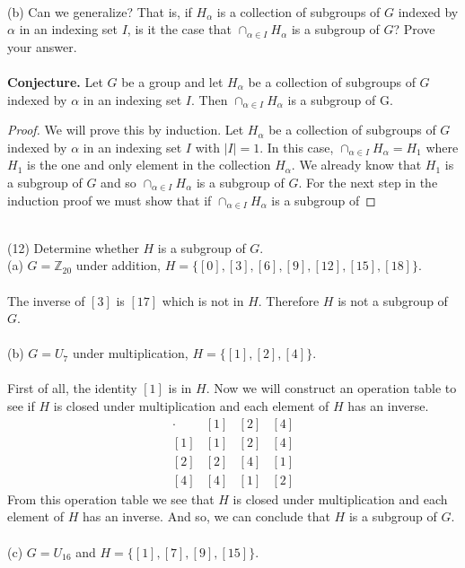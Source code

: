 \documentclass[11pt,a4paper]{article}
\begin{document}
~\\
(b) Can we generalize? That is, if ${H_\alpha}$ is a collection of subgroups of $G$ indexed by $\alpha$ in an indexing set $I$, is it the case that $\cap_{\alpha\in I} H_\alpha$ is a subgroup of $G$? Prove your answer.\\
~\\
{\bf Conjecture.} Let $G$ be a group and let ${H_\alpha}$ be a collection of subgroups of $G$ indexed by $\alpha$ in an indexing set $I$. Then $\cap_{\alpha\in I} H_\alpha$ is a subgroup of G.

\begin{proof}
We will prove this by induction. Let ${H_\alpha}$ be a collection of subgroups of $G$ indexed by $\alpha$ in an indexing set $I$ with $|I|=1$. In this case, $\cap_{\alpha\in I} H_\alpha = H_1$ where $H_1$ is the one and only element in the collection ${H_\alpha}$. We already know that $H_1$ is a subgroup of $G$ and so $\cap_{\alpha\in I} H_\alpha$ is a subgroup of $G$. For the next step in the induction proof we must show that if $\cap_{\alpha\in I} H_\alpha$ is a subgroup of 
\end{proof}
~\\
(12) Determine whether $H$ is a subgroup of $G$.\\
(a) $G=\mathbb{Z}_{20}$ under addition, $H=\{[0],[3],[6],[9],[12],[15],[18]\}$.\\
~\\
The inverse of $[3]$ is $[17]$ which is not in $H$. Therefore $H$ is not a subgroup of $G$.\\
~\\
(b) $G=U_7$ under multiplication, $H=\{[1],[2],[4]\}$.\\
~\\
First of all, the identity $[1]$ is in $H$. Now we will construct an operation table to see if $H$ is closed under multiplication and each element of $H$ has an inverse.
\[
\begin{array}{c|c|c|c}
\cdot & [1] & [2] & [4]\\\hline
[1] & [1] & [2] & [4]\\\hline
[2] & [2] & [4] & [1]\\\hline
[4] & [4] & [1] & [2]
\end{array}
\]
From this operation table we see that $H$ is closed under multiplication and each element of $H$ has an inverse. And so, we can conclude that $H$ is a subgroup of $G$.\\
~\\
(c) $G=U_{16}$ and $H=\{[1],[7],[9],[15]\}$.\\
\end{document}
